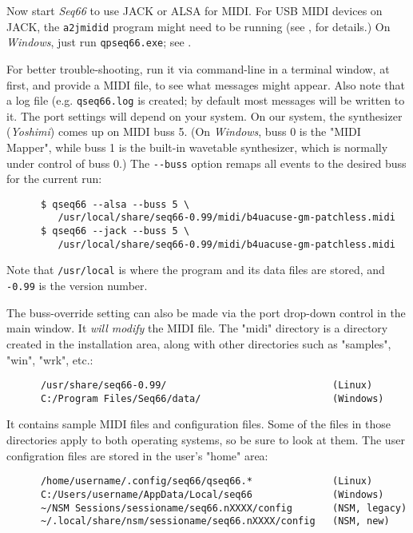    Now start \textsl{Seq66} to use JACK or ALSA for MIDI.
   For USB MIDI devices on JACK, the \texttt{a2jmidid} program might
   need to be running
   (see , for details.)
   On \textsl{Windows}, just run \texttt{qpseq66.exe};
   see .

   For better trouble-shooting, run it via command-line in
   a terminal window, at first, and provide a MIDI file, to
   see what messages might appear.
   Also note that a log file (e.g. \texttt{qseq66.log} is created;
   by default most messages will be written to it.
   The port settings will depend on your system.
   On our system, the synthesizer (\textsl{Yoshimi}) comes up on MIDI buss 5.
   (On \textsl{Windows}, buss 0 is the "MIDI Mapper", while buss 1 is the
   built-in wavetable synthesizer, which is normally under control of buss 0.)
   The \texttt{-{}-buss} option remaps all events to the desired buss for
   the current run:

   \begin{verbatim}
      $ qseq66 --alsa --buss 5 \
         /usr/local/share/seq66-0.99/midi/b4uacuse-gm-patchless.midi
      $ qseq66 --jack --buss 5 \
         /usr/local/share/seq66-0.99/midi/b4uacuse-gm-patchless.midi
   \end{verbatim}

   Note that \texttt{/usr/local} is where the program and its data files
   are stored, and \texttt{-0.99} is the version number.

   The buss-override setting can also be made via the port drop-down control
   in the main window.
   It \textsl{will modify} the MIDI file.
   The "midi" directory is a directory created in the installation area,
   along with other directories such as "samples", "win", "wrk", etc.:

   \begin{verbatim}
      /usr/share/seq66-0.99/                             (Linux)
      C:/Program Files/Seq66/data/                       (Windows)
   \end{verbatim}

   It contains sample MIDI files and configuration files.
   Some of the files in those directories apply to both operating systems, so
   be sure to look at them.
   The user configration files are stored in the user's "home" area:

   \begin{verbatim}
      /home/username/.config/seq66/qseq66.*              (Linux)
      C:/Users/username/AppData/Local/seq66              (Windows)
      ~/NSM Sessions/sessioname/seq66.nXXXX/config       (NSM, legacy)
      ~/.local/share/nsm/sessioname/seq66.nXXXX/config   (NSM, new)
   \end{verbatim}

